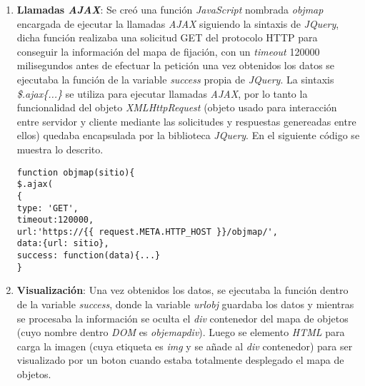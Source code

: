 \begin{enumerate}[label=\alph*) ,font=\bfseries] 
\item \textbf{Llamadas \textit{AJAX}}: Se creó una función \textit{JavaScript} nombrada 
\textit{objmap} encargada de ejecutar la llamadas \textit{AJAX} siguiendo la sintaxis de 
\textit{JQuery}, dicha función realizaba una solicitud GET del protocolo HTTP para conseguir
la información del mapa de fijación, con un \textit{timeout} 120000 milisegundos antes de efectuar
la petición una vez obtenidos los datos se ejecutaba la función de la variable \textit{success} 
propia de \textit{JQuery}. La sintaxis \textit{\$.ajax\{...\}} se utiliza para ejecutar llamadas
\textit{AJAX}, por lo tanto la funcionalidad del objeto \textit{XMLHttpRequest} (objeto usado para 
interacción entre servidor y cliente mediante las solicitudes y respuestas genereadas entre ellos) 
quedaba encapsulada por la biblioteca \textit{JQuery}. En el siguiente código se muestra lo descrito.
\newpage
\begin{lstlisting}[style=Java, caption={Llamada \textit{AJAX} para despliegue del Mapa de Objetos.}]
function objmap(sitio){
$.ajax(
{
type: 'GET',
timeout:120000,
url:'https://{{ request.META.HTTP_HOST }}/objmap/',
data:{url: sitio},
success: function(data){...}
}
\end{lstlisting}
\item \textbf{Visualización}: Una vez obtenidos los datos, se ejecutaba la función dentro de la variable \textit{success}, donde la variable \textit{urlobj} guardaba los datos y mientras se 
procesaba la información se oculta el \textit{div} contenedor del mapa de objetos (cuyo nombre
dentro \textit{DOM} es \textit{objemapdiv}). Luego se elemento \textit{HTML} para carga la imagen
(cuya etiqueta es \textit{img} y se añade al \textit{div} contenedor) para ser visualizado por un 
boton cuando estaba totalmente desplegado el mapa de objetos.
\begin{lstlisting}[style=Java, caption={Función de despligue del Mapa de Objetos.}]


\end{lstlisting}
\end{enumerate}
